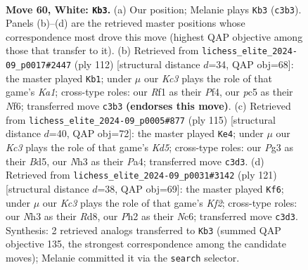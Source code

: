 \documentclass[11pt]{article}
\begin{document}
\clearpage

\begin{figure}[p]\centering
\begin{subfigure}{0.46\textwidth}\centering
\resizebox{\linewidth}{!}{%
\newchessgame
\chessboard[
  setfen={8/6k1/1pb5/p1p5/8/2K3PN/2r1rp1P/5R2 w - - 2 60},
  showmover=false,
  pgfstyle=straightmove, color=movearrow, markmove={c3-b3}
]}
\caption{}
\end{subfigure}\hfill
\begin{subfigure}{0.46\textwidth}\centering
\resizebox{\linewidth}{!}{%
\newchessgame
\chessboard[
  setfen={6R1/1p3p1p/5Npk/p3P3/5P2/8/r1r5/K2R4 w - - 31 57},
  showmover=false,
  pgfstyle=straightmove, color=movearrow, markmove={a1-b1}
]}
\caption{}
\end{subfigure}
\\[4pt]
\begin{subfigure}{0.46\textwidth}\centering
\resizebox{\linewidth}{!}{%
\newchessgame
\chessboard[
  setfen={8/8/4p3/3b3p/pP1k4/P1RR4/2P2K2/r7 b - - 4 58},
  showmover=false,
  pgfstyle=straightmove, color=movearrow, markmove={d4-e4}
]}
\caption{}
\end{subfigure}\hfill
\begin{subfigure}{0.46\textwidth}\centering
\resizebox{\linewidth}{!}{%
\newchessgame
\chessboard[
  setfen={3r4/5k1P/2n3B1/1p1p2R1/pP3PP1/P7/3K4/8 b - - 4 61},
  showmover=false,
  pgfstyle=straightmove, color=movearrow, markmove={f7-f6}
]}
\caption{}
\end{subfigure}
\caption{\textbf{Move 60, White: \texttt{Kb3}.} (a) Our position; Melanie plays \texttt{Kb3} (\texttt{c3b3}). Panels (b)--(d) are the retrieved master positions whose correspondence most drove this move (highest QAP objective among those that transfer to it). (b) Retrieved from \texttt{lichess\_elite\_2024-09\_p0017\#2447} (ply 112) [structural distance $d$=34, QAP obj=68]: the master played \texttt{Kb1}; under $\mu$ our \emph{Kc3} plays the role of that game's \emph{Ka1}; cross-type roles: our \emph{R}f1 as their \emph{P}f4, our \emph{p}c5 as their \emph{N}f6; transferred move \texttt{c3b3} \textbf{(endorses this move)}. (c) Retrieved from \texttt{lichess\_elite\_2024-09\_p0005\#877} (ply 115) [structural distance $d$=40, QAP obj=72]: the master played \texttt{Ke4}; under $\mu$ our \emph{Kc3} plays the role of that game's \emph{Kd5}; cross-type roles: our \emph{P}g3 as their \emph{B}d5, our \emph{N}h3 as their \emph{P}a4; transferred move \texttt{c3d3}. (d) Retrieved from \texttt{lichess\_elite\_2024-09\_p0031\#3142} (ply 121) [structural distance $d$=38, QAP obj=69]: the master played \texttt{Kf6}; under $\mu$ our \emph{Kc3} plays the role of that game's \emph{Kf2}; cross-type roles: our \emph{N}h3 as their \emph{R}d8, our \emph{P}h2 as their \emph{N}c6; transferred move \texttt{c3d3}. Synthesis: 2 retrieved analogs transferred to \texttt{Kb3} (summed QAP objective 135, the strongest correspondence among the candidate moves); Melanie committed it via the \texttt{search} selector.}
\label{fig:thought-m118}
\end{figure}
\end{document}
